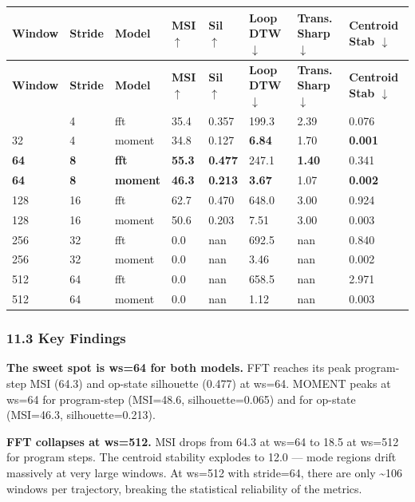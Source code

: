 \documentclass[11pt,a4paper]{article}
\begin{document}
\begin{longtable}{|l|l|l|l|l|l|l|l|}
\hline
\textbf{Window} & \textbf{Stride} & \textbf{Model} & \textbf{MSI $\uparrow$} & \textbf{Sil $\uparrow$} & \textbf{Loop DTW $\downarrow$} & \textbf{Trans. Sharp $\downarrow$} & \textbf{Centroid Stab $\downarrow$} \\
\hline
\endfirsthead
\hline
\textbf{Window} & \textbf{Stride} & \textbf{Model} & \textbf{MSI $\uparrow$} & \textbf{Sil $\uparrow$} & \textbf{Loop DTW $\downarrow$} & \textbf{Trans. Sharp $\downarrow$} & \textbf{Centroid Stab $\downarrow$} \\
\hline
\endhead
\hline
\endfoot
32 & 4 & fft & 35.4 & 0.357 & 199.3 & 2.39 & 0.076 \\
\hline
32 & 4 & moment & 34.8 & 0.127 & \textbf{6.84} & 1.70 & \textbf{0.001} \\
\hline
\textbf{64} & \textbf{8} & \textbf{fft} & \textbf{55.3} & \textbf{0.477} & 247.1 & \textbf{1.40} & 0.341 \\
\hline
\textbf{64} & \textbf{8} & \textbf{moment} & \textbf{46.3} & \textbf{0.213} & \textbf{3.67} & 1.07 & \textbf{0.002} \\
\hline
128 & 16 & fft & 62.7 & 0.470 & 648.0 & 3.00 & 0.924 \\
\hline
128 & 16 & moment & 50.6 & 0.203 & 7.51 & 3.00 & 0.003 \\
\hline
256 & 32 & fft & 0.0 & nan & 692.5 & nan & 0.840 \\
\hline
256 & 32 & moment & 0.0 & nan & 3.46 & nan & 0.002 \\
\hline
512 & 64 & fft & 0.0 & nan & 658.5 & nan & 2.971 \\
\hline
512 & 64 & moment & 0.0 & nan & 1.12 & nan & 0.003 \\
\hline
\end{longtable}

\subsubsection{11.3 Key Findings}

\textbf{The sweet spot is ws=64 for both models.} FFT reaches its peak program-step MSI (64.3) and
op-state silhouette (0.477) at ws=64. MOMENT peaks at ws=64 for program-step (MSI=48.6,
silhouette=0.065) and for op-state (MSI=46.3, silhouette=0.213).

\textbf{FFT collapses at ws=512.} MSI drops from 64.3 at ws=64 to 18.5 at ws=512 for program steps.
The centroid stability explodes to 12.0 --- mode regions drift massively at very large windows.
At ws=512 with stride=64, there are only \textasciitilde{}106 windows per trajectory, breaking the statistical
reliability of the metrics.
\end{document}

